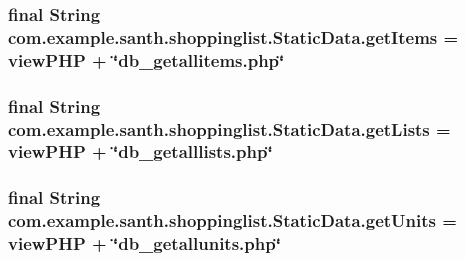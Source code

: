 \subsubsection[{\texorpdfstring{get\+Items}{getItems}}]{\setlength{\rightskip}{0pt plus 5cm}final String com.\+example.\+santh.\+shoppinglist.\+Static\+Data.\+get\+Items = view\+P\+HP + \char`\"{}db\+\_\+getallitems.\+php\char`\"{}\hspace{0.3cm}{\ttfamily [static]}}\hypertarget{classcom_1_1example_1_1santh_1_1shoppinglist_1_1_static_data_afd0845d4cf7cebc48b5bfa68b37e6b1a}{}\label{classcom_1_1example_1_1santh_1_1shoppinglist_1_1_static_data_afd0845d4cf7cebc48b5bfa68b37e6b1a}
\subsubsection[{\texorpdfstring{get\+Lists}{getLists}}]{\setlength{\rightskip}{0pt plus 5cm}final String com.\+example.\+santh.\+shoppinglist.\+Static\+Data.\+get\+Lists = view\+P\+HP + \char`\"{}db\+\_\+getalllists.\+php\char`\"{}\hspace{0.3cm}{\ttfamily [static]}}\hypertarget{classcom_1_1example_1_1santh_1_1shoppinglist_1_1_static_data_a92d144da22eec752791d44cee54099f4}{}\label{classcom_1_1example_1_1santh_1_1shoppinglist_1_1_static_data_a92d144da22eec752791d44cee54099f4}
\subsubsection[{\texorpdfstring{get\+Units}{getUnits}}]{\setlength{\rightskip}{0pt plus 5cm}final String com.\+example.\+santh.\+shoppinglist.\+Static\+Data.\+get\+Units = view\+P\+HP + \char`\"{}db\+\_\+getallunits.\+php\char`\"{}\hspace{0.3cm}{\ttfamily [static]}}\hypertarget{classcom_1_1example_1_1santh_1_1shoppinglist_1_1_static_data_a4ef15e32e18002772a06d568342642c7}{}\label{classcom_1_1example_1_1santh_1_1shoppinglist_1_1_static_data_a4ef15e32e18002772a06d568342642c7}
